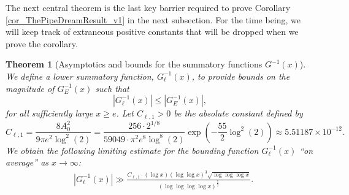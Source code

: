 \documentclass[11pt,reqno,a4letter]{article}
\numberwithin{figure}{section}
\numberwithin{table}{section}
\theoremstyle{plain}
\newtheorem{theorem}{Theorem}
\numberwithin{theorem}{section}
\theoremstyle{definition}
\newcommand{\NBRef}[1]{}
\newcommand{\SuccSim}[0]{\overset{_{\scriptsize{\blacktriangle}}}{\succsim}}
\renewcommand{\SuccSim}[0]{\ensuremath{\gg}}
\begin{document}
The next central theorem is the last key barrier required to prove 
Corollary \ref{cor_ThePipeDreamResult_v1} 
in the next subsection. For the time being, we will keep track of extraneous positive 
constants that will be dropped when we prove the corollary. 

\begin{theorem}[Asymptotics and bounds for the summatory functions $G^{-1}(x)$] 
\label{theorem_gInv_GeneralAsymptoticsForms}
We define a lower summatory function, $G_{\ell}^{-1}(x)$, 
to provide bounds on the magnitude of $G_E^{-1}(x)$ such that 
$$|G_{\ell}^{-1}(x)| \leq |G_E^{-1}(x)|,$$ 
for all sufficiently large $x \geq e$. 
Let $C_{\ell,1} > 0$ be the absolute constant defined by 
\[
C_{\ell,1} = \frac{8 A_0^2}{9 \pi e^2 \log^2(2)}  = 
     \frac{256 \cdot 2^{1/8}}{59049 \cdot \pi^2 e^8 \log^8(2)} 
     \exp\left(-\frac{55}{2} \log^2(2)\right) 
     \approx 5.51187 \times 10^{-12}.  
\]
We obtain the following limiting estimate for the bounding function 
$G_{\ell}^{-1}(x)$ ``on average'' as $x \rightarrow \infty$:   
\begin{align*} 
 & \left\lvert G_{\ell}^{-1}\left(x\right) \right\rvert
     \SuccSim 
     \frac{C_{\ell,1} \cdot (\log x) (\log\log x)^{3} \sqrt{\log\log\log x}}{ 
     (\log\log\log\log x)^{\frac{5}{2}}}. 
\end{align*} 
\end{theorem} 
\NBRef{A10-2020.04-26} 
\end{document}
